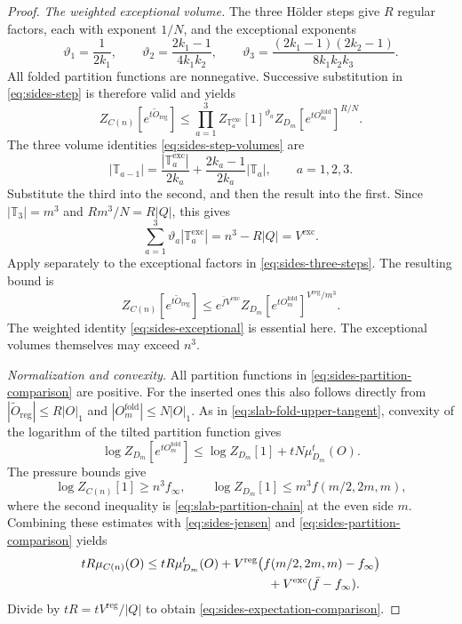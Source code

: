 \begin{proof}
\emph{The weighted exceptional volume.}
The three H\"older steps give $R$ regular factors, each with exponent
$1/N$, and the exceptional exponents
\[
 \vartheta_1=\frac1{2k_1},\qquad
 \vartheta_2=\frac{2k_1-1}{4k_1k_2},\qquad
 \vartheta_3=\frac{(2k_1-1)(2k_2-1)}{8k_1k_2k_3}.
\]
All folded partition functions are nonnegative. Successive
substitution in \eqref{eq:sides-step} is therefore valid and yields
\begin{equation}\label{eq:sides-three-steps}
 Z_{C(n)}[e^{t\widetilde O_{\mathrm{reg}}}]
 \le\prod_{a=1}^3 Z_{\mathbb T_a^{\mathrm{exc}}}[1]^{\vartheta_a}
       Z_{D_m}[e^{tO_m^{\mathrm{fold}}}]^{R/N}.
\end{equation}
The three volume identities \eqref{eq:sides-step-volumes} are
\[
 |\mathbb T_{a-1}|=
       \frac{|\mathbb T_a^{\mathrm{exc}}|}{2k_a}
        +\frac{2k_a-1}{2k_a}|\mathbb T_a|,
        \qquad a=1,2,3.
\]
Substitute the third into the second, and then the result into the
first. Since $|\mathbb T_3|=m^3$ and $Rm^3/N=R|Q|$, this gives
\begin{equation}\label{eq:sides-exceptional}
 \sum_{a=1}^3\vartheta_a|\mathbb T_a^{\mathrm{exc}}|
       =n^3-R|Q|=V^{\mathrm{exc}}.
\end{equation}
Apply  separately to the exceptional
factors in \eqref{eq:sides-three-steps}. The resulting bound is
\begin{equation}\label{eq:sides-partition-comparison}
 Z_{C(n)}[e^{t\widetilde O_{\mathrm{reg}}}]
 \le e^{\bar f V^{\mathrm{exc}}}
       Z_{D_m}[e^{tO_m^{\mathrm{fold}}}]^{V^{\mathrm{reg}}/m^3}.
\end{equation}
The weighted identity \eqref{eq:sides-exceptional} is essential here.
The exceptional volumes themselves may exceed $n^3$.

\emph{Normalization and convexity.}
All partition functions in \eqref{eq:sides-partition-comparison}
are positive. For the inserted ones this also follows directly
from $|\widetilde O_{\mathrm{reg}}|\le R|O|_1$ and
$|O_m^{\mathrm{fold}}|\le N|O|_1$.
As in \eqref{eq:slab-fold-upper-tangent}, convexity of the logarithm
of the tilted partition function gives
\[
 \log Z_{D_m}[e^{tO_m^{\mathrm{fold}}}]
      \le\log Z_{D_m}[1]+tN\mu_{D_m}^t(O).
\]
The pressure bounds give
\[
 \log Z_{C(n)}[1]\ge n^3f_\infty,\qquad
 \log Z_{D_m}[1]\le m^3f(m/2,2m,m),
\]
where the second inequality is \eqref{eq:slab-partition-chain}
at the even side $m$. Combining these estimates with
\eqref{eq:sides-jensen} and
\eqref{eq:sides-partition-comparison} yields
\begin{align*}
 tR\mu_{C(n)}(O)
 &\le tR\mu_{D_m}^t(O)
       +V^{\mathrm{reg}}\bigl(f(m/2,2m,m)-f_\infty\bigr)\\
 &\hspace{35mm}+V^{\mathrm{exc}}(\bar f-f_\infty).
\end{align*}
Divide by $tR=tV^{\mathrm{reg}}/|Q|$ to obtain
\eqref{eq:sides-expectation-comparison}.
\end{proof}

